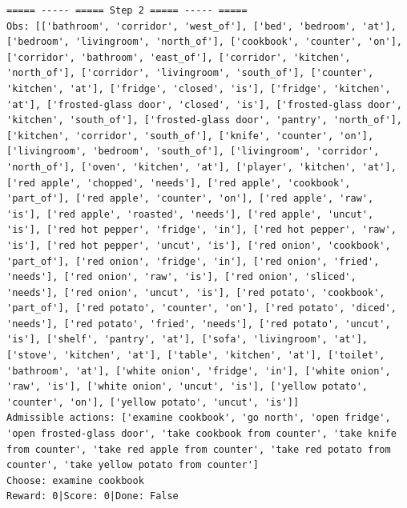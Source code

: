 \documentclass[11pt]{article}
\begin{document}
\begin{lstlisting}
===== ----- ===== Step 2 ===== ----- =====
Obs: [['bathroom', 'corridor', 'west_of'], ['bed', 'bedroom', 'at'], ['bedroom', 'livingroom', 'north_of'], ['cookbook', 'counter', 'on'], ['corridor', 'bathroom', 'east_of'], ['corridor', 'kitchen', 'north_of'], ['corridor', 'livingroom', 'south_of'], ['counter', 'kitchen', 'at'], ['fridge', 'closed', 'is'], ['fridge', 'kitchen', 'at'], ['frosted-glass door', 'closed', 'is'], ['frosted-glass door', 'kitchen', 'south_of'], ['frosted-glass door', 'pantry', 'north_of'], ['kitchen', 'corridor', 'south_of'], ['knife', 'counter', 'on'], ['livingroom', 'bedroom', 'south_of'], ['livingroom', 'corridor', 'north_of'], ['oven', 'kitchen', 'at'], ['player', 'kitchen', 'at'], ['red apple', 'chopped', 'needs'], ['red apple', 'cookbook', 'part_of'], ['red apple', 'counter', 'on'], ['red apple', 'raw', 'is'], ['red apple', 'roasted', 'needs'], ['red apple', 'uncut', 'is'], ['red hot pepper', 'fridge', 'in'], ['red hot pepper', 'raw', 'is'], ['red hot pepper', 'uncut', 'is'], ['red onion', 'cookbook', 'part_of'], ['red onion', 'fridge', 'in'], ['red onion', 'fried', 'needs'], ['red onion', 'raw', 'is'], ['red onion', 'sliced', 'needs'], ['red onion', 'uncut', 'is'], ['red potato', 'cookbook', 'part_of'], ['red potato', 'counter', 'on'], ['red potato', 'diced', 'needs'], ['red potato', 'fried', 'needs'], ['red potato', 'uncut', 'is'], ['shelf', 'pantry', 'at'], ['sofa', 'livingroom', 'at'], ['stove', 'kitchen', 'at'], ['table', 'kitchen', 'at'], ['toilet', 'bathroom', 'at'], ['white onion', 'fridge', 'in'], ['white onion', 'raw', 'is'], ['white onion', 'uncut', 'is'], ['yellow potato', 'counter', 'on'], ['yellow potato', 'uncut', 'is']]
Admissible actions: ['examine cookbook', 'go north', 'open fridge', 'open frosted-glass door', 'take cookbook from counter', 'take knife from counter', 'take red apple from counter', 'take red potato from counter', 'take yellow potato from counter']
Choose: examine cookbook
Reward: 0|Score: 0|Done: False


\end{lstlisting}
\end{document}
